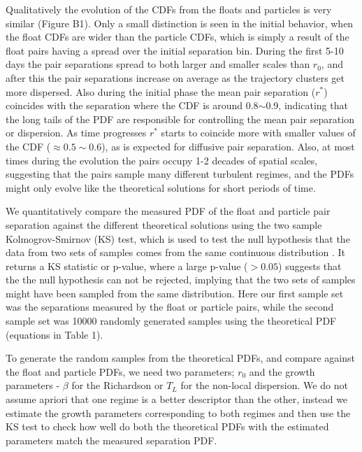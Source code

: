 \documentclass[]{ametsoc}
\begin{document}
Qualitatively the evolution of the CDFs from the floats and particles is very similar (Figure B1). Only a small distinction is seen in the initial behavior, when the float CDFs are wider than the particle CDFs, which is simply a result of the float pairs having a spread over the initial separation bin.
During the first 5-10 days the pair separations spread to both larger and smaller scales than $r_0$, and after this the pair separations increase on average as the trajectory clusters get more dispersed. Also during the initial phase the mean pair separation ($r^*$) coincides with the separation where the CDF is around 0.8$\sim$0.9, indicating that the long tails of the PDF are responsible for controlling the mean pair separation or dispersion. As time progresses $r^*$ starts to coincide more with smaller values of the CDF ($\approx 0.5\sim0.6$), as is expected for diffusive pair separation. Also, at most times during the evolution the pairs occupy 1-2 decades of spatial scales, suggesting that the pairs sample many different turbulent regimes, and the PDFs might only evolve like the theoretical solutions for short periods of time.

We quantitatively compare the measured PDF of the float and particle pair separation against the different theoretical solutions using the two sample Kolmogrov-Smirnov (KS) test, which is used to test the null hypothesis that the data from two sets of samples comes from the same continuous distribution \citep{berger2014kolmogorov}. It returns a KS statistic or p-value, where a large p-value ($> 0.05$) suggests that the the null hypothesis can not be rejected, implying that the two sets of samples might have been sampled from the same distribution. Here our first sample set was the separations measured by the float or particle pairs, while the second sample set was 10000 randomly generated samples using the theoretical PDF (equations in Table 1).

To generate the random samples from the theoretical PDFs, and compare against the float and particle PDFs, we need two parameters; $r_0$ and the growth parameters - $\beta$ for the Richardson or $T_L$ for the non-local dispersion. We do not assume apriori that one regime is a better descriptor than the other, instead we estimate the growth parameters corresponding to both regimes and then use the KS test to check how well do both the theoretical PDFs with the estimated parameters match the measured separation PDF.
\end{document}
